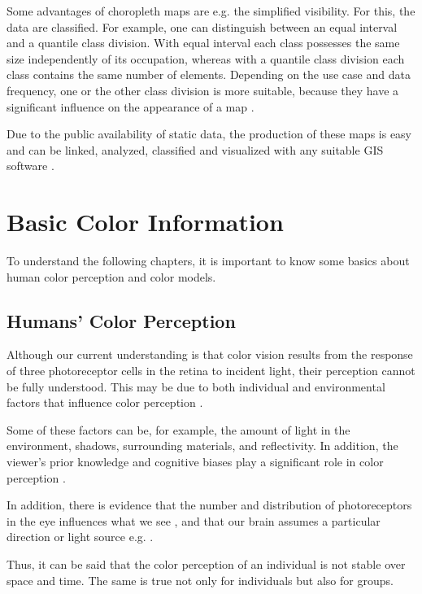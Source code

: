 Some advantages of choropleth maps are e.g. the simplified visibility. For this, the data are classified. For example, one can distinguish between an equal interval and a quantile class division. With equal interval each class possesses the same size independently of its occupation, whereas with a quantile class division each class contains the same number of elements. Depending on the use case and data frequency, one or the other class division is more suitable, because they have a significant influence on the appearance of a map \parencite{schiewe2015, rahlf2020}.

Due to the public availability of static data, the production of these maps is easy and can be linked, analyzed, classified and visualized with any suitable GIS software \parencite{hruby2016}.

\section{Basic Color Information}

To understand the following chapters, it is important to know some basics about human color perception and color models.

\subsection{Humans' Color Perception}
Although our current understanding is that color vision results from the response of three photoreceptor cells in the retina to incident light, their perception cannot be fully understood. This may be due to both individual and environmental factors that influence color perception \parencite{lafer2015, xiao2016}.

Some of these factors can be, for example, the amount of light in the environment, shadows, surrounding materials, and reflectivity. In addition, the viewer's prior knowledge and cognitive biases play a significant role in color perception \parencite{derefeldt2004, foster2011}.

In addition, there is evidence that the number and distribution of photoreceptors in the eye influences what we see \textcite{roy1991}, and that our brain assumes a particular direction or light source e.g. \textcite{gegenfurtner2015, lafer2015}.

Thus, it can be said that the color perception of an individual is not stable over space and time. The same is true not only for individuals but also for groups.  


